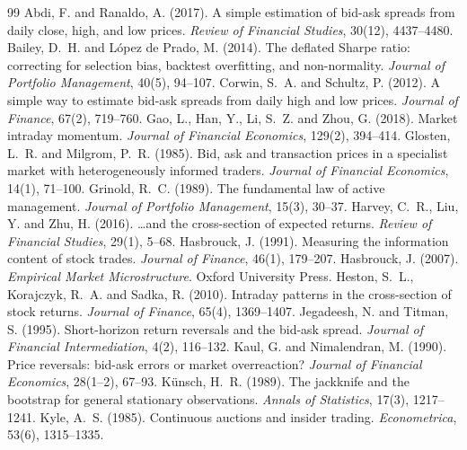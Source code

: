 \begin{thebibliography}{99}
 Abdi, F. and Ranaldo, A. (2017). A simple estimation of bid-ask spreads from daily close, high, and low prices. \emph{Review of Financial Studies}, 30(12), 4437--4480.
 Bailey, D.~H. and L\'opez de Prado, M. (2014). The deflated Sharpe ratio: correcting for selection bias, backtest overfitting, and non-normality. \emph{Journal of Portfolio Management}, 40(5), 94--107.
 Corwin, S.~A. and Schultz, P. (2012). A simple way to estimate bid-ask spreads from daily high and low prices. \emph{Journal of Finance}, 67(2), 719--760.
 Gao, L., Han, Y., Li, S.~Z. and Zhou, G. (2018). Market intraday momentum. \emph{Journal of Financial Economics}, 129(2), 394--414.
 Glosten, L.~R. and Milgrom, P.~R. (1985). Bid, ask and transaction prices in a specialist market with heterogeneously informed traders. \emph{Journal of Financial Economics}, 14(1), 71--100.
 Grinold, R.~C. (1989). The fundamental law of active management. \emph{Journal of Portfolio Management}, 15(3), 30--37.
 Harvey, C.~R., Liu, Y. and Zhu, H. (2016). \ldots and the cross-section of expected returns. \emph{Review of Financial Studies}, 29(1), 5--68.
 Hasbrouck, J. (1991). Measuring the information content of stock trades. \emph{Journal of Finance}, 46(1), 179--207.
 Hasbrouck, J. (2007). \emph{Empirical Market Microstructure}. Oxford University Press.
 Heston, S.~L., Korajczyk, R.~A. and Sadka, R. (2010). Intraday patterns in the cross-section of stock returns. \emph{Journal of Finance}, 65(4), 1369--1407.
 Jegadeesh, N. and Titman, S. (1995). Short-horizon return reversals and the bid-ask spread. \emph{Journal of Financial Intermediation}, 4(2), 116--132.
 Kaul, G. and Nimalendran, M. (1990). Price reversals: bid-ask errors or market overreaction? \emph{Journal of Financial Economics}, 28(1--2), 67--93.
 K\"unsch, H.~R. (1989). The jackknife and the bootstrap for general stationary observations. \emph{Annals of Statistics}, 17(3), 1217--1241.
 Kyle, A.~S. (1985). Continuous auctions and insider trading. \emph{Econometrica}, 53(6), 1315--1335.

\end{thebibliography}
